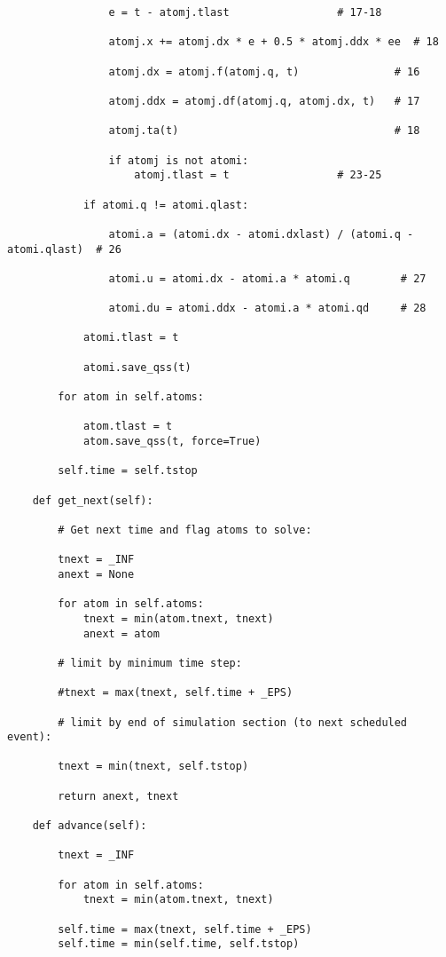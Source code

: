\begin{lstlisting}
                e = t - atomj.tlast                 # 17-18

                atomj.x += atomj.dx * e + 0.5 * atomj.ddx * ee  # 18

                atomj.dx = atomj.f(atomj.q, t)               # 16

                atomj.ddx = atomj.df(atomj.q, atomj.dx, t)   # 17

                atomj.ta(t)                                  # 18

                if atomj is not atomi:
                    atomj.tlast = t                 # 23-25

            if atomi.q != atomi.qlast:

                atomi.a = (atomi.dx - atomi.dxlast) / (atomi.q - atomi.qlast)  # 26

                atomi.u = atomi.dx - atomi.a * atomi.q        # 27

                atomi.du = atomi.ddx - atomi.a * atomi.qd     # 28

            atomi.tlast = t

            atomi.save_qss(t)

        for atom in self.atoms:

            atom.tlast = t
            atom.save_qss(t, force=True)

        self.time = self.tstop

    def get_next(self):

        # Get next time and flag atoms to solve:

        tnext = _INF
        anext = None

        for atom in self.atoms:
            tnext = min(atom.tnext, tnext)
            anext = atom

        # limit by minimum time step:

        #tnext = max(tnext, self.time + _EPS)

        # limit by end of simulation section (to next scheduled event):

        tnext = min(tnext, self.tstop)

        return anext, tnext

    def advance(self):

        tnext = _INF

        for atom in self.atoms:
            tnext = min(atom.tnext, tnext)

        self.time = max(tnext, self.time + _EPS)
        self.time = min(self.time, self.tstop)


\end{lstlisting}
